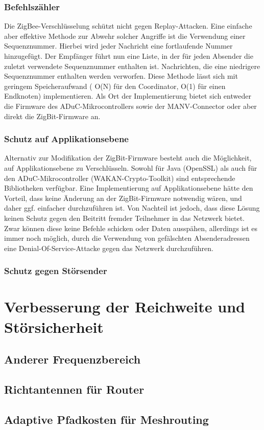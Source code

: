 \subsubsection{Befehlszähler}
Die ZigBee-Verschlüsselung schützt nicht gegen Replay-Attacken. Eine einfache aber effektive Methode zur Abwehr solcher
Angriffe ist die Verwendung einer Sequenznummer. Hierbei wird jeder Nachricht eine fortlaufende Nummer hinzugefügt. 
Der Empfänger führt nun eine Liste, in der für jeden Absender die zuletzt verwendete Sequenznummer enthalten ist.
Nachrichten, die eine niedrigere Sequenznummer enthalten werden verworfen. Diese Methode lässt sich mit geringem
Speicheraufwand ( O(N) für den Coordinator, O(1) für einen Endknoten) implementieren. Als Ort der Implementierung
bietet sich entweder die Firmware des ADuC-Mikrocontrollers sowie der MANV-Connector oder aber direkt die ZigBit-Firmware
an.

\subsubsection{Schutz auf Applikationsebene}
Alternativ zur Modifikation der ZigBit-Firmware besteht auch die Möglichkeit, auf Applikationsebene zu Verschlüsseln.
Sowohl für Java (OpenSSL) als auch für den ADuC-Mikrocontroller (WAKAN-Crypto-Toolkit) sind entsprechende Bibliotheken
verfügbar. Eine Implementierung auf Applikationsebene hätte den Vorteil, dass keine Änderung an der ZigBit-Firmware
notwendig wären, und daher ggf. einfacher durchzuführen ist. Von Nachteil ist jedoch, dass diese Lösung keinen Schutz
gegen den Beitritt fremder Teilnehmer in das Netzwerk bietet. Zwar können diese keine Befehle schicken oder Daten ausspähen,
allerdings ist es immer noch möglich, durch die Verwendung von gefälschten Absenderadressen eine Denial-Of-Service-Attacke
gegen das Netzwerk durchzuführen. 

\subsubsection{Schutz gegen Störsender}


    
\section{Verbesserung der Reichweite und Störsicherheit}
\subsection{Anderer Frequenzbereich}
\subsection{Richtantennen für Router}
\subsection{Adaptive Pfadkosten für Meshrouting}
